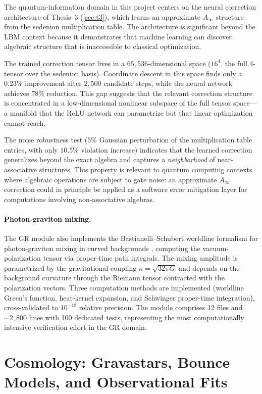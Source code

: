 \documentclass[12pt,openany]{report}
\theoremstyle{definition}
\theoremstyle{plain}
\theoremstyle{remark}
\begin{document}
The quantum-information domain in this project centers on the neural
correction architecture of Thesis~3 (\cref{sec:t3}), which learns
an approximate $A_\infty$ structure from the sedenion multiplication
table.  The architecture is significant beyond the LBM context because
it demonstrates that machine learning can discover algebraic structure
that is inaccessible to classical optimization.

The trained correction tensor lives in a $65{,}536$-dimensional space
($16^4$, the full 4-tensor over the sedenion basis).  Coordinate
descent in this space finds only a $0.23\%$ improvement after $2{,}500$
candidate steps, while the neural network achieves $78\%$ reduction.
This gap suggests that the relevant correction structure is concentrated
in a low-dimensional nonlinear subspace of the full tensor space---a
manifold that the ReLU network can parametrize but that linear
optimization cannot reach.

The noise robustness test ($5\%$ Gaussian perturbation of the
multiplication table entries, with only $10.5\%$ violation increase)
indicates that the learned correction generalizes beyond the exact
algebra and captures a \emph{neighborhood} of near-associative
structures.  This property is relevant to quantum computing contexts
where algebraic operations are subject to gate noise: an approximate
$A_\infty$ correction could in principle be applied as a software error
mitigation layer for computations involving non-associative algebras.

\paragraph{Photon-graviton mixing.}
The GR module also implements the Bastianelli--Schubert worldline
formalism for photon-graviton mixing in curved backgrounds
\cite{Bastianelli2005}, computing the vacuum-polarization tensor
via proper-time path integrals.  The mixing amplitude is parametrized
by the gravitational coupling $\kappa = \sqrt{32\pi G}$ and depends
on the background curvature through the Riemann tensor contracted
with the polarization vectors.  Three computation methods are
implemented (worldline Green's function, heat-kernel expansion,
and Schwinger proper-time integration), cross-validated to
$10^{-12}$ relative precision.  The module comprises 12 files and
${\sim}2{,}800$ lines with 100 dedicated tests, representing
the most computationally intensive verification effort in the GR domain.


\section{Cosmology: Gravastars, Bounce Models, and Observational Fits}
\end{document}
